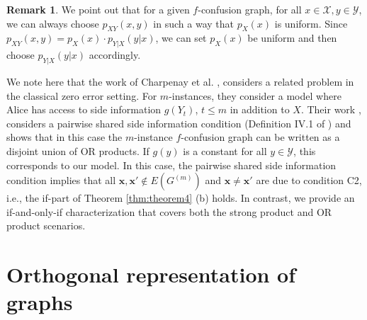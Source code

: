 \documentclass[journal, onecolumn, draftcls]{IEEEtran}
\theoremstyle{definition}
\newtheorem{remark}{Remark}
\newcommand{\calV}{\mathcal{V}}
\newcommand{\calW}{\mathcal{W}}
\newcommand{\calX}{\mathcal{X}}
\newcommand{\calY}{\mathcal{Y}}
\newcommand{\bfx}{\mathbf{x}}
\newcommand{\meng}[1]{\marginpar{+}{\bf Ruoyu's remark}: {\em #1}}
\newcommand{\aditya}[1]{\marginpar{+}{\bf Aditya's remark}: {\em #1}}
\begin{document}

\begin{remark}\label{remark:free_to_choose_p_x}
    We point out that for a given $f$-confusion graph, for all $x\in\calX,y \in \calY$, we can always choose $p_{XY}(x,y)$ in such a way that $p_X(x)$ is uniform. Since $p_{XY}(x,y)= p_X(x) \cdot p_{Y|X}(y|x)$, we can set $p_X(x)$ be uniform and then choose $ p_{Y|X}(y|x)$ accordingly. %
\end{remark} 

% 
We note here that the work of Charpenay et al. \cite{CharpenayTR23ITW}, considers a related problem in the classical zero error setting. %
For $m$-instances, they consider a model where Alice has access to side information $g(Y_t)$, $t \leq m$ in addition to $X$. 
%
%
Their work \cite{CharpenayTR23ITW}, considers a pairwise shared side information condition (Definition IV.1 of \cite{CharpenayTR23ITW}) and shows that in this case the $m$-instance $f$-confusion graph can be written as a
disjoint union of OR products. If $g(y)$ is a constant for all $y\in \calY$, this corresponds to our model. In this case, the pairwise shared side information condition implies that all $\bfx,\bfx'\notin E(G^{(m)})$ and $\bfx\ne \bfx'$ are due to condition C2, i.e., the if-part of Theorem \ref{thm:theorem4} (b) holds. In contrast, we provide an if-and-only-if characterization that covers both the strong product and OR product scenarios.



\section{Orthogonal representation of graphs}\label{sec:orth_rep}
\end{document}
